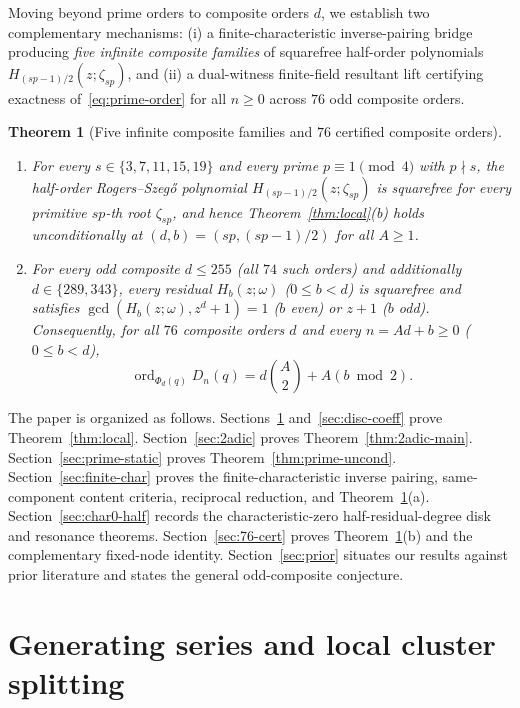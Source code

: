 \documentclass[11pt,reqno]{amsart}
\numberwithin{equation}{section}
\newtheorem{theorem}{Theorem}[section]
\theoremstyle{definition}
\theoremstyle{remark}
\newcommand{\ord}{\operatorname{ord}}
\begin{document}
Moving beyond prime orders to composite orders $d$, we establish two complementary mechanisms: (i) a finite-characteristic inverse-pairing bridge producing \emph{five infinite composite families} of squarefree half-order polynomials $H_{(sp-1)/2}(z;\zeta_{sp})$, and (ii) a dual-witness finite-field resultant lift certifying exactness of~\eqref{eq:prime-order} for all $n\ge 0$ across $76$ odd composite orders.

\begin{theorem}[Five infinite composite families and $76$ certified composite orders]
\label{thm:composite-main}
\begin{enumerate}[label=(\alph*),leftmargin=2em]
\item For every $s\in\{3,7,11,15,19\}$ and every prime $p\equiv 1\pmod 4$ with $p\nmid s$, the half-order Rogers--Szeg\H{o} polynomial $H_{(sp-1)/2}(z;\zeta_{sp})$ is squarefree for every primitive $sp$-th root $\zeta_{sp}$, and hence Theorem~\ref{thm:local}(b) holds unconditionally at $(d,b)=(sp,(sp-1)/2)$ for all $A\ge 1$.
\item For every odd composite $d\le 255$ (all $74$ such orders) and additionally $d\in\{289,343\}$, every residual $H_b(z;\omega)$ ($0\le b<d$) is squarefree and satisfies $\gcd(H_b(z;\omega),z^d+1)=1$ ($b$ even) or $z+1$ ($b$ odd). Consequently, for all $76$ composite orders $d$ and every $n=Ad+b\ge 0$ ($0\le b<d$),
\[
\ord_{\Phi_d(q)} D_n(q) = d\binom{A}{2} + A(b\bmod 2).
\]
\end{enumerate}
\end{theorem}

The paper is organized as follows. Sections~\ref{sec:local-split} and~\ref{sec:disc-coeff} prove Theorem~\ref{thm:local}. Section~\ref{sec:2adic} proves Theorem~\ref{thm:2adic-main}. Section~\ref{sec:prime-static} proves Theorem~\ref{thm:prime-uncond}. Section~\ref{sec:finite-char} proves the finite-characteristic inverse pairing, same-component content criteria, reciprocal reduction, and Theorem~\ref{thm:composite-main}(a). Section~\ref{sec:char0-half} records the characteristic-zero half-residual-degree disk and resonance theorems. Section~\ref{sec:76-cert} proves Theorem~\ref{thm:composite-main}(b) and the complementary fixed-node identity. Section~\ref{sec:prior} situates our results against prior literature and states the general odd-composite conjecture.

\section{Generating series and local cluster splitting}
\label{sec:local-split}
\end{document}
